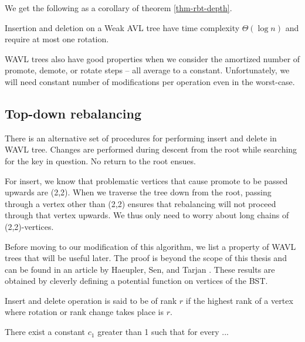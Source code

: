 







We get the following as a corollary of theorem \ref{thm-rbt-depth}.

\begin{prop}
Insertion and deletion on a Weak AVL tree have time complexity $\Theta(\log n)$ and require at most one rotation.
\end{prop}

WAVL trees also have good properties when we consider the amortized number of promote, demote, or rotate steps -- all average to a constant. Unfortunately, we will need constant number of modifications per operation even in the worst-case.

\subsection{Top-down rebalancing}

There is an alternative set of procedures for performing insert and delete in WAVL tree. Changes are performed during descent from the root while searching for the key in question. No return to the root ensues.

For insert, we know that problematic vertices that cause promote to be passed upwards are (2,2). When we traverse the tree down from the root, passing through a vertex other than (2,2) ensures that rebalancing will not proceed through that vertex upwards. We thus only need to worry about long chains of (2,2)-vertices.

Before moving to our modification of this algorithm, we list a property of WAVL trees that will be useful later. The proof is beyond the scope of this thesis and can be found in an article by Haeupler, Sen, and Tarjan \cite{rank-balanced-trees}. These results are obtained by cleverly defining a potential function on vertices of the BST.

\begin{defn}
Insert and delete operation is said to be of rank $r$ if the highest rank of a vertex where rotation or rank change takes place is $r$.
\end{defn}

\begin{prop}
There exist a constant $c_1$ greater than 1 such that for every ... %
\end{prop}